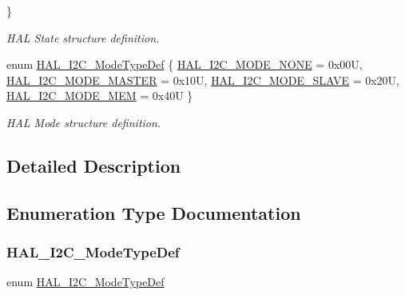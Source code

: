 \begin{DoxyCompactItemize}
 \}\begin{DoxyCompactList}\small\item\em H\+AL State structure definition. \end{DoxyCompactList}
\item 
enum \hyperlink{group___i2_c___exported___types_gabcbb7b844f2ffd63c4e530c117882062}{H\+A\+L\+\_\+\+I2\+C\+\_\+\+Mode\+Type\+Def} \{ \hyperlink{group___i2_c___exported___types_ggabcbb7b844f2ffd63c4e530c117882062a98c8fd642b7ac45a23479bd597fc7a71}{H\+A\+L\+\_\+\+I2\+C\+\_\+\+M\+O\+D\+E\+\_\+\+N\+O\+NE} = 0x00U, 
\hyperlink{group___i2_c___exported___types_ggabcbb7b844f2ffd63c4e530c117882062a1eea98660a170dd7b191c9dfe46da6d2}{H\+A\+L\+\_\+\+I2\+C\+\_\+\+M\+O\+D\+E\+\_\+\+M\+A\+S\+T\+ER} = 0x10U, 
\hyperlink{group___i2_c___exported___types_ggabcbb7b844f2ffd63c4e530c117882062a817358d19d278261f2047a5ec8ec6b53}{H\+A\+L\+\_\+\+I2\+C\+\_\+\+M\+O\+D\+E\+\_\+\+S\+L\+A\+VE} = 0x20U, 
\hyperlink{group___i2_c___exported___types_ggabcbb7b844f2ffd63c4e530c117882062a3f592bd942f973242aac6b7df79f3f1e}{H\+A\+L\+\_\+\+I2\+C\+\_\+\+M\+O\+D\+E\+\_\+\+M\+EM} = 0x40U
 \}\begin{DoxyCompactList}\small\item\em H\+AL Mode structure definition. \end{DoxyCompactList}
\end{DoxyCompactItemize}


\subsection{Detailed Description}


\subsection{Enumeration Type Documentation}
\mbox{\label{group___i2_c___exported___types_gabcbb7b844f2ffd63c4e530c117882062}} 
\subsubsection{\texorpdfstring{H\+A\+L\+\_\+\+I2\+C\+\_\+\+Mode\+Type\+Def}{HAL\_I2C\_ModeTypeDef}}
{\footnotesize\ttfamily enum \hyperlink{group___i2_c___exported___types_gabcbb7b844f2ffd63c4e530c117882062}{H\+A\+L\+\_\+\+I2\+C\+\_\+\+Mode\+Type\+Def}}



